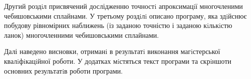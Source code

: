 \documentclass[ukrainian,14pt]{extarticle}
\begin{document}
Другий роздiл присвячений дослідженню точностi апроксимацiї многочленими чебишовськими сплайнами.
У третьому роздiлi описано програму, яка здiйснює побудову рівномірних наближень (із заданою точністю і заданою кiлькiстю ланок)
многочленними чебишовськими сплайнами.

Далі наведено висновки, отриманi в результатi виконання магiстерської квалiфiкацiйної роботи. У додатках мiстяться текст програми та скрiншоти основних результатiв роботи програми.



\end{document}
